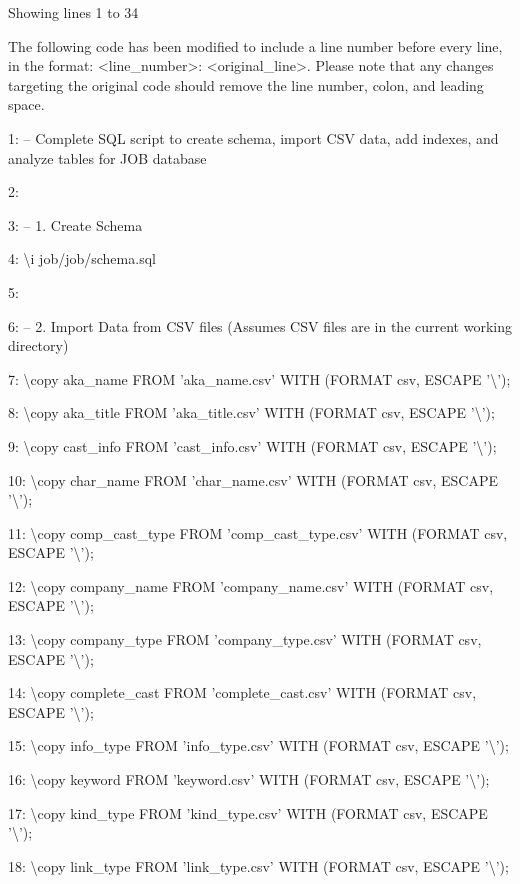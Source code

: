 \documentclass[11pt,a4paper]{article}
\begin{document}
{Showing lines 1 to 34

The following code has been modified to include a line number before every line, in the format: <line\_number>: <original\_line>. Please note that any changes targeting the original code should remove the line number, colon, and leading space.

1: -- Complete SQL script to create schema, import CSV data, add indexes, and analyze tables for JOB database

2:

3: -- 1. Create Schema

4: \textbackslash{}i job/job/schema.sql

5:

6: -- 2. Import Data from CSV files (Assumes CSV files are in the current working directory)

7: \textbackslash{}copy aka\_name FROM 'aka\_name.csv' WITH (FORMAT csv, ESCAPE '\textbackslash{}');

8: \textbackslash{}copy aka\_title FROM 'aka\_title.csv' WITH (FORMAT csv, ESCAPE '\textbackslash{}');

9: \textbackslash{}copy cast\_info FROM 'cast\_info.csv' WITH (FORMAT csv, ESCAPE '\textbackslash{}');

10: \textbackslash{}copy char\_name FROM 'char\_name.csv' WITH (FORMAT csv, ESCAPE '\textbackslash{}');

11: \textbackslash{}copy comp\_cast\_type FROM 'comp\_cast\_type.csv' WITH (FORMAT csv, ESCAPE '\textbackslash{}');

12: \textbackslash{}copy company\_name FROM 'company\_name.csv' WITH (FORMAT csv, ESCAPE '\textbackslash{}');

13: \textbackslash{}copy company\_type FROM 'company\_type.csv' WITH (FORMAT csv, ESCAPE '\textbackslash{}');

14: \textbackslash{}copy complete\_cast FROM 'complete\_cast.csv' WITH (FORMAT csv, ESCAPE '\textbackslash{}');

15: \textbackslash{}copy info\_type FROM 'info\_type.csv' WITH (FORMAT csv, ESCAPE '\textbackslash{}');

16: \textbackslash{}copy keyword FROM 'keyword.csv' WITH (FORMAT csv, ESCAPE '\textbackslash{}');

17: \textbackslash{}copy kind\_type FROM 'kind\_type.csv' WITH (FORMAT csv, ESCAPE '\textbackslash{}');

18: \textbackslash{}copy link\_type FROM 'link\_type.csv' WITH (FORMAT csv, ESCAPE '\textbackslash{}');

}
\end{document}

